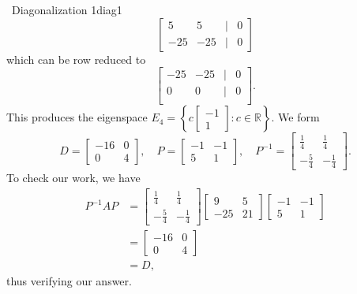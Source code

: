\begin{example}{\Difficulty\,\Difficulty\,\,Diagonalization 1}{diag1}
            \begin{equation*}
                \begin{bmatrix}
                    5 & 5 & | & 0 \\
                    -25 & -25 & | & 0
                \end{bmatrix}
            \end{equation*} 
            which can be row reduced to
            \begin{equation*}
                \begin{bmatrix}
                    -25 & -25 & | & 0 \\
                    0 & 0 & | & 0 \\
                \end{bmatrix}.
            \end{equation*} 
            This produces the eigenspace \(E_4=\left\{c\begin{bmatrix} -1 \\ 1 \end{bmatrix}:c\in\mathbb{R}\right\}\). We form 
            \begin{equation*}
                D=\begin{bmatrix} -16 & 0 \\ 0 & 4 \end{bmatrix},\quad P=\begin{bmatrix} -1 & -1 \\ 5 & 1 \end{bmatrix},\quad P^{-1}=\begin{bmatrix} \frac{1}{4} & \frac{1}{4} \\ -\frac{5}{4} & -\frac{1}{4} \end{bmatrix}.
            \end{equation*}
            To check our work, we have
            \begin{align*}
                P^{-1}AP&=\begin{bmatrix} \frac{1}{4} & \frac{1}{4} \\ -\frac{5}{4} & -\frac{1}{4} \end{bmatrix} \begin{bmatrix} 9 & 5 \\ -25 & 21 \end{bmatrix} \begin{bmatrix} -1 & -1 \\ 5 & 1 \end{bmatrix} \\
                &=\begin{bmatrix} -16 & 0 \\ 0 & 4 \end{bmatrix} \\
                &=D,
            \end{align*}
            thus verifying our answer.
        \end{example}
